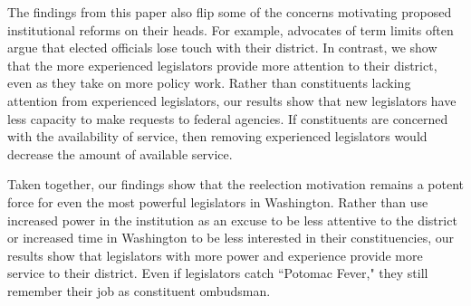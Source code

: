 \documentclass[12pt]{article}
\begin{document}


The findings from this paper also flip some of the concerns motivating proposed institutional reforms on their heads. For example, advocates of term limits often argue that elected officials lose touch with their district. In contrast, we show that the more experienced legislators provide more attention to their district, even as they take on more policy work. Rather than constituents lacking attention from experienced legislators, our results show that new legislators have less capacity to make requests to federal agencies.  If constituents are concerned with the availability of service, then removing experienced legislators would decrease the amount of available service.   


Taken together, our findings show that the reelection motivation remains a potent force for even the most powerful legislators in Washington. Rather than use increased power in the institution as an excuse to be less attentive to the district or increased time in Washington to be less interested in their constituencies, our results show that legislators with more power and experience provide more service to their district. Even if legislators catch ``Potomac Fever," they still remember their job as constituent ombudsman. 
\end{document}
